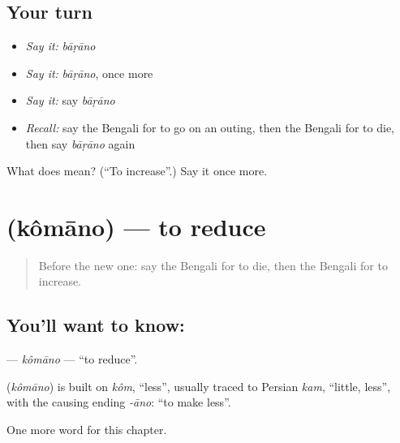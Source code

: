 \subsection*{Your turn}
\begin{itemize}
\raggedright
  \item \emph{Say it:} \emph{bāṛāno}
  \item \emph{Say it:} \emph{bāṛāno}, once more
  \item \emph{Say it:} say \emph{bāṛāno}
  \item \emph{Recall:} say the Bengali for to go on an outing, then the Bengali for to die, then say \emph{bāṛāno} again
\end{itemize}

\begin{tcolorbox}[breakable,colback=teal!4,colframe=teal!35!black,title={Before you move on}]
What does  mean? (\textquotedblleft{}To increase\textquotedblright{}.) Say it once more.
\end{tcolorbox}
\section[\texorpdfstring{\bn{কমানো} (kômāno)}{কমানো (kômāno)}]{ (kômāno) — to reduce}

\label{lesson:BN-C238-komano}



\begin{quote}
Before the new one: say the Bengali for to die, then the Bengali for to increase.
\end{quote}

\subsection*{You'll want to know: }
\textbf{} — \emph{kômāno} — \textquotedblleft{}to reduce\textquotedblright{}.

\begin{cousinweb}
\textbf{} (\emph{kômāno}) is built on \emph{kôm}, \textquotedblleft{}less\textquotedblright{}, usually traced to Persian \emph{kam}, \textquotedblleft{}little, less\textquotedblright{}, with the causing ending \emph{-āno}: \textquotedblleft{}to make less\textquotedblright{}.
\end{cousinweb}

\begin{grammarlens}[title={What you've built}]
One more word for this chapter.
\end{grammarlens}

